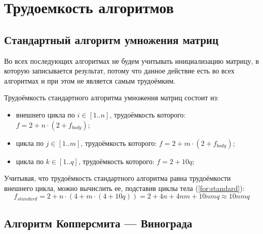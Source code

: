 \section{Трудоемкость алгоритмов}

\subsection{Стандартный алгоритм умножения матриц}

Во всех последующих алгоритмах не будем учитывать инициализацию матрицу, в которую записывается результат, потому что данное действие есть во всех алгоритмах и при этом не является самым трудоёмким.

Трудоёмкость стандартного алгоритма умножения матриц состоит из:
\begin{itemize}
    \item внешнего цикла по $i \in [1..n]$, трудоёмкость которого: $f = 2 + n \cdot (2 + f_{body})$;
    \item цикла по $j \in [1..m]$, трудоёмкость которого: $f = 2 + m \cdot (2 + f_{body})$;
    \item цикла по $k \in [1..q]$, трудоёмкость которого: $f = 2 + 10q$;
\end{itemize}

Учитывая, что трудоёмкость стандартного алгоритма равна трудоёмкости внешнего цикла, можно вычислить ее, подставив циклы тела (\ref{for:standard}):
\begin{equation}
    \label{for:standard}
    f_{standard} = 2 + n \cdot (4 + m \cdot (4 + 10q)) = 2 + 4n + 4nm + 10nmq \approx 10nmq
\end{equation}

\subsection{Алгоритм Копперсмита — Винограда}

